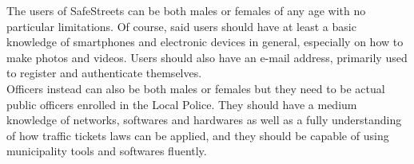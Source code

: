 The users of SafeStreets can be both males or females of any age with no particular limitations. Of course, said users should have at least a basic knowledge of smartphones and electronic devices in general, especially on how to make photos and videos.
Users should also have an e-mail address, primarily used to register and authenticate themselves.\\
Officers instead can also be both males or females but they need to be actual public officers enrolled in the Local Police.
They should have a medium knowledge of networks, softwares and hardwares as well as a fully understanding of how traffic tickets laws can be applied, and they should be capable of using municipality tools and softwares fluently.